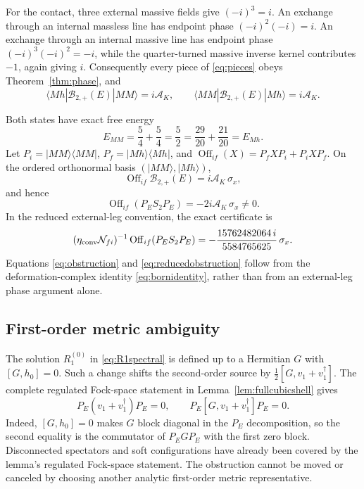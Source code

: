 \documentclass[11pt]{article}
\theoremstyle{definition}
\theoremstyle{remark}
\newcommand{\dg}{\dagger}
\newcommand{\AK}{\mathcal A_K}
\newcommand{\Born}{\mathcal B}
\begin{document}
For the contact, three external massive fields give $(-i)^3=i$.  An
exchange through an internal massless line has endpoint phase
$(-i)^2(-i)=i$.  An exchange through an internal massive line has
endpoint phase $(-i)^3(-i)^2=-i$, while the quarter-turned massive
inverse kernel contributes $-1$, again giving $i$.  Consequently every
piece of \eqref{eq:pieces} obeys Theorem~\ref{thm:phase}, and
\begin{equation}\label{eq:tplus}
\langle Mh|\Born_{2,+}(E)|MM\rangle=i\AK,
\qquad
\langle MM|\Born_{2,+}(E)|Mh\rangle=i\AK.
\end{equation}

Both states have exact free energy
\begin{equation}
E_{MM}=\frac54+\frac54=\frac52
=\frac{29}{20}+\frac{21}{20}=E_{Mh}.
\end{equation}
Let $P_i=|MM\rangle\langle MM|$, $P_f=|Mh\rangle\langle Mh|$, and
$\operatorname{Off}_{if}(X)=P_fXP_i+P_iXP_f$.  On the ordered
orthonormal basis $(|MM\rangle,|Mh\rangle)$,
\begin{equation}\label{eq:Tblock}
\operatorname{Off}_{if}\Born_{2,+}(E)=i\AK\,\sigma_x,
\end{equation}
and hence
\begin{equation}\label{eq:obstruction}
\boxed{
\operatorname{Off}_{if}(P_ES_2P_E)
=-2i\AK\,\sigma_x\ne0.}
\end{equation}
In the reduced external-leg convention, the exact certificate is
\begin{equation}\label{eq:reducedobstruction}
(\eta_{\rm conv}\mathcal N_{fi})^{-1}
\operatorname{Off}_{if}(P_ES_2P_E)
=-\frac{15762482064\,i}{5584765625}\,\sigma_x.
\end{equation}
Equations \eqref{eq:obstruction} and \eqref{eq:reducedobstruction}
follow from the deformation-complex identity \eqref{eq:bornidentity},
rather than from an external-leg phase argument alone.

\subsection{First-order metric ambiguity}

The solution $R_1^{(0)}$ in \eqref{eq:R1spectral} is defined up to a
Hermitian $G$ with $[G,h_0]=0$.  Such a change shifts the second-order
source by $\tfrac12[G,v_1+v_1^{\dg}]$.  The complete regulated
Fock-space statement in Lemma~\ref{lem:fullcubicshell} gives
\begin{equation}\label{eq:ambiguity}
P_E(v_1+v_1^{\dg})P_E=0,
\qquad
P_E[G,v_1+v_1^{\dg}]P_E=0.
\end{equation}
Indeed, $[G,h_0]=0$ makes $G$ block diagonal in the $P_E$ decomposition,
so the second equality is the commutator of $P_EGP_E$ with the first
zero block.  Disconnected spectators and soft configurations have
already been covered by the lemma's regulated Fock-space statement.
The obstruction cannot be moved or canceled by choosing another analytic
first-order metric representative.
\end{document}
